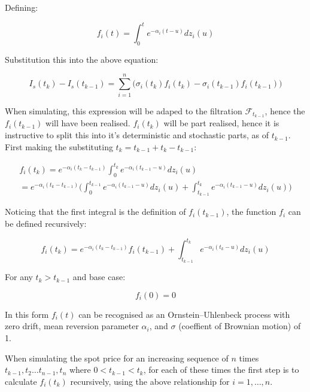 \documentclass{article}
\begin{document}
Defining:

\begin{equation}
    f_i(t) = \int_0^{t} e^{-\alpha_i(t-u)} dz_i(u)
\end{equation}

Substitution this into the above equation:

\begin{equation}
    I_s(t_k) - I_s(t_{k-1}) = \sum_{i=1}^n \biggl( \sigma_i(t_k) 
    f_i(t_k) - \sigma_i(t_{k-1}) f_i(t_{k-1}) \biggr)
\end{equation}


When simulating, this expression will be adaped to the filtration $\mathcal{F}_{t_{k-1}}$, hence the
$f_i(t_{k-1})$ will have been realised. $f_i(t_k)$ will be part realised, hence it is instructive
to split this into it's deterministic and stochastic parts, as of $t_{k-1}$. First making the
substituting $t_k = t_{k-1} + t_k - t_{k-1}$:

\begin{eqnarray}
    \nonumber
    f_i(t_k) = e^{-\alpha_i(t_k - t_{k-1})} \int_0^{t_k} e^{-\alpha_i(t_{k-1}-u)} dz_i(u) \\
        = e^{-\alpha_i(t_k - t_{k-1})} \biggl(\int_0^{t_{k-1}} e^{-\alpha_i(t_{k-1}-u)} dz_i(u) +
        \int_{t_{k-1}}^{t_k} e^{-\alpha_i(t_{k-1}-u)} dz_i(u) \biggr)
\end{eqnarray}

Noticing that the first integral is the definition of $f_i(t_{k-1})$, the function $f_i$ can
be defined recursively:

\begin{equation}
    f_i(t_k) = e^{-\alpha_i(t_k - t_{k-1})}f_i(t_{k-1}) + \int_{t_{k-1}}^{t_k} e^{-\alpha_i(t_k-u)} dz_i(u)
\end{equation}

For any $t_k > t_{k-1}$ and base case:

\begin{equation}
    f_i(0) = 0
\end{equation}

In this form $f_i(t)$ can be recognised as an Ornstein–Uhlenbeck process with zero drift,
mean reversion parameter $\alpha_i$, and $\sigma$ (coeffient of Brownian motion) of 1.

\bigskip

When simulating the spot price for an increasing sequence of $n$
times $t_{k-1}, t_2 \hdots t_{n-1}, t_n$ where $0 < t_{k-1} < t_k$, for each of these
times the first step is to calculate $f_i(t_k)$ recursively, using the above relationship %
for $i = 1, \hdots, n$.
\end{document}
